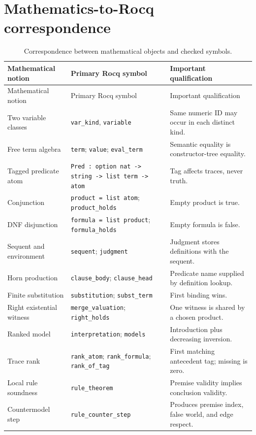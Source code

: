\documentclass[11pt,oneside]{book}
\DeclareRobustCommand{\code}[1]{\nolinkurl{#1}}
\begin{document}
\appendix

\chapter{Mathematics-to-Rocq correspondence}
\label{app:correspondence}

\begin{longtable}{@{}p{}p{}p{}@{}}
\caption{Correspondence between mathematical objects and checked symbols.}\\
\toprule
Mathematical notion & Primary Rocq symbol & Important qualification\\
\midrule
\endfirsthead
\toprule
Mathematical notion & Primary Rocq symbol & Important qualification\\
\midrule
\endhead
Two variable classes & \code{var_kind}, \code{variable} & Same numeric ID may occur in each distinct kind.\\
Free term algebra & \code{term}; \code{value}; \code{eval_term} & Semantic equality is constructor-tree equality.\\
Tagged predicate atom & \code{Pred : option nat -> string -> list term -> atom} & Tag affects traces, never truth.\\
Conjunction & \code{product = list atom}; \code{product_holds} & Empty product is true.\\
DNF disjunction & \code{formula = list product}; \code{formula_holds} & Empty formula is false.\\
Sequent and environment & \code{sequent}; \code{judgment} & Judgment stores definitions with the sequent.\\
Horn production & \code{clause_body}; \code{clause_head} & Predicate name supplied by definition lookup.\\
Finite substitution & \code{substitution}; \code{subst_term} & First binding wins.\\
Right existential witness & \code{merge_valuation}; \code{right_holds} & One witness is shared by a chosen product.\\
Ranked model & \code{interpretation}; \code{models} & Introduction plus decreasing inversion.\\
Trace rank & \code{rank_atom}; \code{rank_formula}; \code{rank_of_tag} & First matching antecedent tag; missing is zero.\\
Local rule soundness & \code{rule_theorem} & Premise validity implies conclusion validity.\\
Countermodel step & \code{rule_counter_step} & Produces premise index, false world, and edge respect.\\

\end{longtable}
\end{document}
